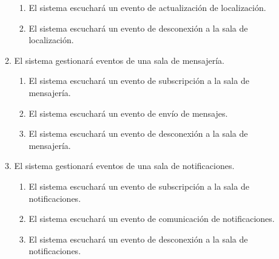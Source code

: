 \begin{enumerate}[label*=RI\arabic*.]
\begin{enumerate}[label*=\arabic*.]
\begin{enumerate}[label*=\arabic*.]
            \item El sistema escuchará un evento de actualización de localización.
            \item El sistema escuchará un evento de desconexión a la sala de localización.
        \end{enumerate}
        \item El sistema gestionará eventos de una sala de mensajería.
        \begin{enumerate}[label*=\arabic*.]
            \item El sistema escuchará un evento de subscripción a la sala de mensajería.
            \item El sistema escuchará un evento de envío de mensajes.
            \item El sistema escuchará un evento de desconexión a la sala de mensajería.
        \end{enumerate}
        \item El sistema gestionará eventos de una sala de notificaciones.
        \begin{enumerate}[label*=\arabic*.]
            \item El sistema escuchará un evento de subscripción a la sala de notificaciones.
            \item El sistema escuchará un evento de comunicación de notificaciones.
            \item El sistema escuchará un evento de desconexión a la sala de notificaciones.
        \end{enumerate}
    \end{enumerate}
\end{enumerate}